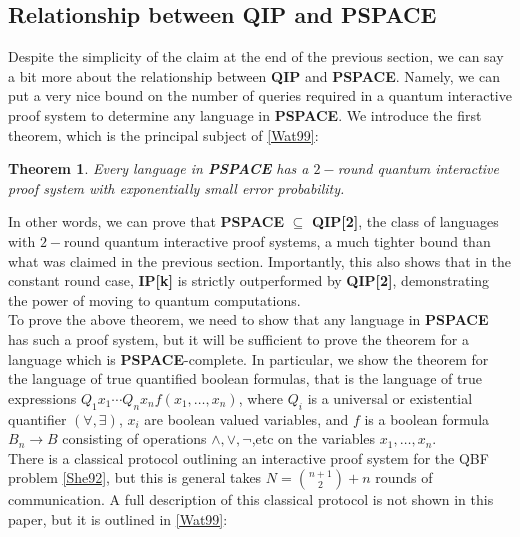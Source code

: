 \documentclass[12pt]{article}
\newtheorem{thm}{Theorem}
\numberwithin{thm}{section}
\numberwithin{defn}{section}
\numberwithin{prop}{section}
\numberwithin{rmk}{section}
\begin{document}
	\subsection{Relationship between QIP and PSPACE}
	Despite the simplicity of the claim at the end of the previous section, we can say a bit more about the relationship between \textbf{QIP} and \textbf{PSPACE}. Namely, we can put a very nice bound on the number of queries required in a quantum interactive proof system to determine any language in \textbf{PSPACE}. We introduce the first theorem, which is the principal subject of \hyperref[wat99]{[Wat99]}:
	\begin{thm}
		Every language in \textbf{PSPACE} has a $2-$round quantum interactive proof system with exponentially small error probability. 
	\end{thm}

	In other words, we can prove that \textbf{PSPACE} $\subseteq$ \textbf{QIP[2]}, the class of languages with $2-$round quantum interactive proof systems, a much tighter bound than what was claimed in the previous section. Importantly, this also shows that in the constant round case, \textbf{IP[k]} is strictly outperformed by \textbf{QIP[2]}, demonstrating the power of moving to quantum computations.\\
	
	To prove the above theorem, we need to show that any language in \textbf{PSPACE} has such a proof system, but it will be sufficient to prove the theorem for a language which is \textbf{PSPACE}-complete. In particular, we show the theorem for the language of true quantified boolean formulas, that is the language of true expressions $Q_1x_1\cdots Q_nx_nf(x_1,\dots,x_n)$, where $Q_i$ is a universal or existential quantifier $(\forall,\exists)$, $x_i$ are boolean valued variables, and $f$ is a boolean formula $B_n\to B$ consisting of operations $\wedge,\vee,\neg$,etc on the variables $x_1,\dots,x_n$. \\
	
	There is a classical protocol outlining an interactive proof system for the QBF problem \hyperref[she92]{[She92]}, but this is general takes $N={{n+1}\choose{2}}+n$ rounds of communication. A full description of this classical protocol is not shown in this paper, but it is outlined in \hyperref[wat99]{[Wat99]}:
	
\end{document}
